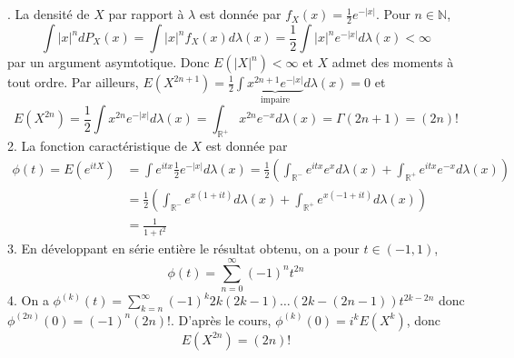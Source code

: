 \documentclass{report}
\begin{document}
\subsection{} \noindent{}\\ 
\\ 
\\
. La densité de $X$ par rapport à $\lambda$ est donnée par $f_X(x)=\frac 12 e^{-|x|}$. Pour $n\in \mathbb N$, 
$$\int |x|^n dP_X(x) = \int |x|^n f_X(x) d\lambda(x)= \frac{1}{2}\int |x|^n e^{-|x|}d\lambda(x) <\infty $$ par un argument asymtotique. Donc $E(|X|^n)<\infty$ et $X$ admet des moments à tout ordre.\newline
Par ailleurs, $E(X^{2n+1})=\frac{1}{2}\int \underbrace{x^{2n+1} e^{-|x|}}_{\text{impaire}}d\lambda(x)=0$ et $$E(X^{2n})=\frac{1}{2}\int x^{2n} e^{-|x|} d\lambda(x)=\int_{\mathbb R^+}x^{2n} e^{-x} d\lambda(x)= \Gamma(2n+1)=(2n)!$$
2. La fonction caractéristique de $X$ est donnée par 
$$\begin{aligned}\phi(t)=E(e^{itX})&=\int e^{itx}\frac 12 e^{-|x|} d\lambda(x)
=\frac{1}{2}\left(\int_{\mathbb R^-} e^{itx} e^{x} d\lambda(x) + \int_{\mathbb R^+} e^{itx} e^{-x} d\lambda(x) \right)\\
&=\frac{1}{2}\left(\int_{\mathbb R^-} e^{x(1+it)} d\lambda(x) + \int_{\mathbb R^+} e^{x(-1+it)} d\lambda(x) \right) \\
&= \frac 1{1+t^2}
\end{aligned}
$$
3. En développant en série entière le résultat obtenu, on a pour $t\in (-1,1)$, $$\phi(t)=\sum_{n=0}^\infty (-1)^n t^{2n}$$
4. On a $\phi^{(k)}(t)=\sum_{k=n}^\infty (-1)^k 2k(2k-1)\ldots(2k-(2n-1))t^{2k-2n}$ \newline 
donc $\phi^{(2n)}(0)=(-1)^n(2n)!$. D'après le cours, $\phi^{(k)}(0)=i^kE(X^k)$, donc $$E(X^{2n})=(2n)!$$
\end{document}
